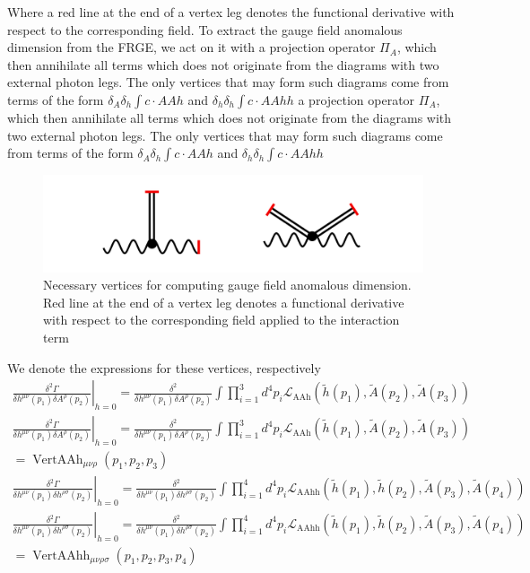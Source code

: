 \documentclass[11pt, a4paper]{article}
\begin{document}
Where a red line at the end of a vertex leg denotes the functional derivative with respect to the corresponding field.
To extract the gauge field anomalous dimension from the FRGE, we act on it with
a projection operator $\varPi_A$, which then annihilate all terms which does not originate from the diagrams with two external photon legs.
The only vertices that may form such diagrams come from terms of the form $\delta_{A}\delta_h \int c \cdot AAh$ and $\delta_h \delta_h \int c \cdot AAhh$
a projection operator $\varPi_A$, which then annihilate all terms which does not originate from the diagrams with two external photon legs.
The only vertices that may form such diagrams come from terms of the form $\delta_{A}\delta_h \int c \cdot AAh$ and $\delta_h \delta_h \int c \cdot AAhh$
\begin{figure}[H]
    \includegraphics[width=1\textwidth]{./figures/vertices.png}
    \caption{Necessary vertices for computing gauge field anomalous dimension. Red line at the end of a vertex leg denotes a functional derivative with respect to the corresponding field applied to the interaction term}
\end{figure}
We denote the expressions for these vertices, respectively
\begin{gather}
    \left. \frac{\delta^2 \Gamma}{\delta h^{\mu\nu}(p_1) \delta A^{\rho}(p_2)}\right|_{h=0} = \frac{\delta^2}{\delta h^{\mu\nu}(p_1) \delta A^{\rho}(p_2)} \int \prod_{i=1}^3 d^4 p_i \mathcal{L}_{\text{AAh}}\left(\tilde{h}(p_1), \tilde{A}(p_2), \tilde{A}(p_3)\right)\\
    \left. \frac{\delta^2 \Gamma}{\delta h^{\mu\nu}(p_1) \delta A^{\rho}(p_2)}\right|_{h=0} = \frac{\delta^2}{\delta h^{\mu\nu}(p_1) \delta A^{\rho}(p_2)} \int \prod_{i=1}^3 d^4 p_i \mathcal{L}_{\text{AAh}}\left(\tilde{h}(p_1), \tilde{A}(p_2), \tilde{A}(p_3)\right)\\
    = \operatorname{VertAAh}_{\mu\nu\rho}(p_1,p_2,p_3)\\
    \left. \frac{\delta^2 \Gamma}{\delta h^{\mu\nu}(p_1) \delta h^{\rho\sigma}(p_2)}\right|_{h=0} = \frac{\delta^2}{\delta h^{\mu\nu}(p_1) \delta h^{\rho\sigma}(p_2)} \int \prod_{i=1}^4 d^4 p_i \mathcal{L}_{\text{AAhh}}\left(\tilde{h}(p_1), \tilde{h}(p_2), \tilde{A}(p_3), \tilde{A}(p_4) \right)\\
    \left. \frac{\delta^2 \Gamma}{\delta h^{\mu\nu}(p_1) \delta h^{\rho\sigma}(p_2)}\right|_{h=0} = \frac{\delta^2}{\delta h^{\mu\nu}(p_1) \delta h^{\rho\sigma}(p_2)} \int \prod_{i=1}^4 d^4 p_i \mathcal{L}_{\text{AAhh}}\left(\tilde{h}(p_1), \tilde{h}(p_2), \tilde{A}(p_3), \tilde{A}(p_4) \right)\\
     = \operatorname{VertAAhh}_{\mu\nu\rho\sigma}(p_1,p_2,p_3,p_4)
\end{gather}
\end{document}
